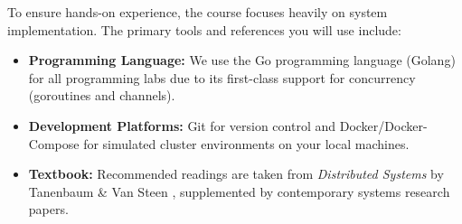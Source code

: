 To ensure hands-on experience, the course focuses heavily on system implementation. The primary tools and references you will use include:
\begin{itemize}
    \item \textbf{Programming Language:} We use the Go programming language (Golang) for all programming labs due to its first-class support for concurrency (goroutines and channels).
    \item \textbf{Development Platforms:} Git for version control and Docker/Docker-Compose for simulated cluster environments on your local machines.
    \item \textbf{Textbook:} Recommended readings are taken from \textit{Distributed Systems} by Tanenbaum \& Van Steen \citep{tanenbaum2017distributed}, supplemented by contemporary systems research papers.
\end{itemize}
